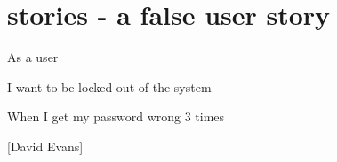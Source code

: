 \section*{stories - a false user story}
As a user

I want to be locked out of the system

When I get my password wrong 3 times

[David Evans]

